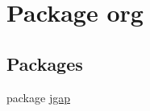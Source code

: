 \hypertarget{namespaceorg}{\section{Package org}
\label{namespaceorg}
}
\subsection*{Packages}
\begin{DoxyCompactItemize}
\item 
package \hyperlink{namespaceorg_1_1jgap}{jgap}
\end{DoxyCompactItemize}
